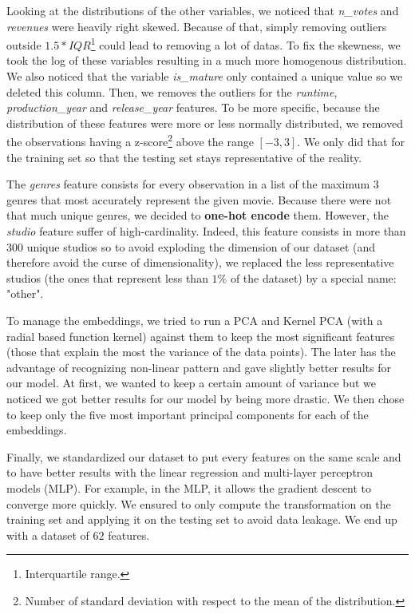Looking at the distributions of the other variables, we noticed that \textit{n\_votes} and \textit{revenues} were heavily right skewed. Because of that, simply removing outliers outside $1.5 * IQR$\footnote{Interquartile range.} could lead to removing a lot of datas. To fix the skewness, we took the log of these variables resulting in a much more homogenous distribution. We also noticed that the variable \textit{is\_mature} only contained a unique value so we deleted this column. Then, we removes the outliers for the \textit{runtime}, \textit{production\_year} and \textit{release\_year} features. To be more specific, because the distribution of these features were more or less normally distributed, we removed the observations having a z-score\footnote{Number of standard deviation with respect to the mean of the distribution.} above the range $[-3, 3]$. We only did that for the training set so that the testing set stays representative of the reality. 

The \textit{genres} feature consists for every observation in a list of the maximum $3$ genres that most accurately represent the given movie. Because there were not that much unique genres, we decided to \textbf{one-hot encode} them. However, the \textit{studio} feature suffer of high-cardinality. Indeed, this feature consists in more than $300$ unique studios so to avoid exploding the dimension of our dataset (and therefore avoid the curse of dimensionality), we replaced the less representative studios (the ones that represent less than $1\%$ of the dataset) by a special name: "other". 

To manage the embeddings, we tried to run a PCA and Kernel PCA (with a radial based function kernel) against them to keep the most significant features (those that explain the most the variance of the data points). The later has the advantage of recognizing non-linear pattern and gave slightly better results for our model. At first, we wanted to keep a certain amount of variance but we noticed we got better results for our model by being more drastic. We then chose to keep only the five most important principal components for each of the embeddings.

Finally, we standardized our dataset to put every features on the same scale and to have better results with the linear regression and multi-layer perceptron models (MLP). For example, in the MLP, it allows the gradient descent to converge more quickly. We ensured to only compute the transformation on the training set and applying it on the testing set to avoid data leakage.
We end up with a dataset of $62$ features.